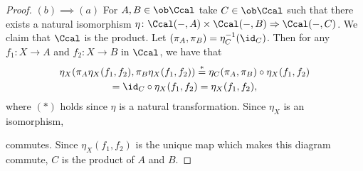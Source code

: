 \begin{solution}
\begin{proof}
        $(b)\implies (a)$ For $A, B\in\ob\Ccal$ take $C\in\ob\Ccal$ such that there exists a natural isomorphism $\eta\colon\Ccal(-,A)\times\Ccal(-, B)\Rightarrow\Ccal(-,C)$.
        We claim that $\Ccal$ is the product. Let $(\pi_A,\pi_B)=\eta_C^{-1}(\id_C)$. 
        Then for any $f_1\colon X\to A$ and $f_2\colon X\to B$ in $\Ccal$, we have that 
        \begin{multline*}
            \eta_X(\pi_A\eta_X(f_1,f_2), \pi_B\eta_X(f_1,f_2))\stackrel{*}{=}\eta_C(\pi_A,\pi_B)\circ\eta_X(f_1,f_2)\\=\id_C\circ\eta_X(f_1,f_2)=\eta_X(f_1,f_2),
        \end{multline*}
        where $(*)$ holds since $\eta$ is a natural transformation. Since $\eta_X$ is an isomorphism,
        \begin{center}
        \end{center}
          commutes. 
          Since $\eta_X(f_1,f_2)$ is the unique map which makes this diagram commute, $C$ is the product of $A$ and $B$.
    \end{proof}


\end{solution}
